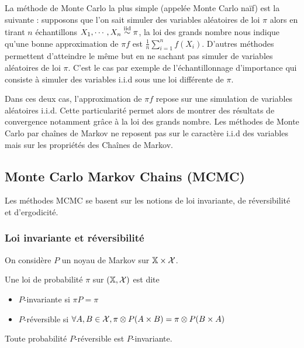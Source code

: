 \documentclass[10pt,a4paper]{article}
\begin{document}
La méthode de Monte Carlo la plus simple (appelée Monte Carlo naïf) est la suivante : supposons que l'on sait simuler des variables aléatoires de loi $\pi$ alors en tirant $n$ échantillons $X_1, \cdots, X_n \stackrel{\rm iid}{\sim} \pi$, la loi des grands nombre nous indique qu'une bonne approximation de $\pi f$ est $\frac{1}{n} \sum_{i=1}^n f(X_i)$. D'autres méthodes permettent d'atteindre le même but en ne sachant pas simuler de variables aléatoires de loi $\pi$. C'est le cas par exemple de l'échantillonnage d'importance qui consiste à simuler des variables i.i.d sous une loi différente de $\pi$.

Dans ces deux cas, l'approximation de $\pi f$ repose sur une simulation de variables aléatoires i.i.d. Cette particularité permet alors de montrer des résultats de convergence notamment grâce à la loi des grands nombre. Les méthodes de Monte Carlo par chaînes de Markov ne reposent pas sur le caractère i.i.d des variables mais sur les propriétés des Chaînes de Markov. 

\subsection{Monte Carlo Markov Chains (MCMC)}

Les méthodes MCMC se basent sur les notions de loi invariante, de réversibilité et d'ergodicité.

\subsubsection{Loi invariante et réversibilité}

On considère $P$ un noyau de Markov sur $\mathbb{X} \times \mathcal{X}$.
\begin{Def}
	Une loi de probabilité $\pi$ sur $(\mathbb{X}, \mathcal{X})$ est dite
	\begin{itemize}
		\item $P$-invariante si $\pi P = \pi$
		\item $P$-réversible si $\forall A,B \in \mathcal{X}, \pi \otimes P (A \times B) = \pi \otimes P (B \times A)$
	\end{itemize}
\end{Def}

\begin{Prop}
	Toute probabilité $P$-réversible est $P$-invariante.
\end{Prop}
\end{document}
